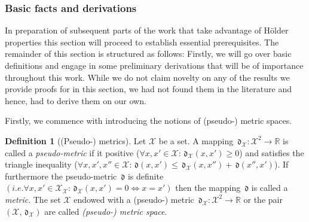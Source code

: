 \documentclass{article} %
\newcommand{\jcom}[1]{\textcolor{cyan} {\emph{Jan says: #1}}}
\theoremstyle{definition}
\newtheorem{defn}[thm]{Definition}
\theoremstyle{remark}
\newcommand{\Real}{\mathbb R}
\newcommand{\inspace}{\ensuremath{ \mathcal X}}
\newcommand{\metric}{\, \mathfrak{d}} %
\begin{document}



\subsubsection{Basic facts and derivations}
In preparation of subsequent parts of the work that take advantage of H\"older properties this section will proceed to establish essential prerequisites.
The remainder of this section is structured as follows: Firstly, we will go over basic definitions and engage in some preliminary derivations that will be of importance throughout this work.
While we do not claim novelty on any of the results we provide proofs for in this section, we had not found them in the literature and hence, had to derive them on our own.

Firstly, we commence with introducing the notions of (pseudo-) metric spaces.

\begin{defn}[(Pseudo-) metrics]
Let $\inspace$ be a set. A mapping $\metric_\inspace: \inspace^2 \to \Real$ is called a \emph{pseudo-metric} if it positive ($\forall x,x' \in \inspace: \metric_\inspace(x,x') \geq 0$) and satisfies the triangle inequality ($\forall x,x',x'' \in \inspace: \metric(x,x') \leq \metric_\inspace(x,x'') + \metric (x'',x')$). If furthermore the pseudo-metric $\metric$ is definite $(i.e. \forall x,x' \in \inspace_\inspace: \metric_\inspace(x,x') =0 \Leftrightarrow x=x')$ then 
the mapping $\metric$ is called a \emph{metric}. The set $\inspace$ endowed with a (pseudo-) metric $\metric_\inspace: \inspace^2 \to \Real$ or the pair $(\inspace, \metric_\inspace)$ are called \emph{(pseudo-) metric space}.
 \end{defn}
\end{document}
